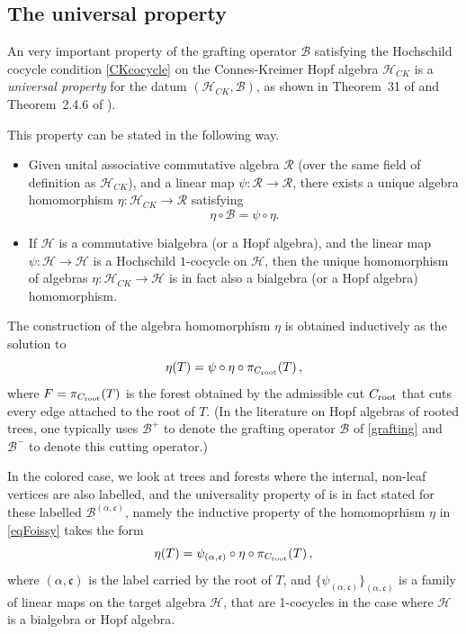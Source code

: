 \documentclass[12pt]{amsart}
\numberwithin{equation}{section}
\def\cB{{\mathcal B}}
\def\cH{{\mathcal H}}
\def\cR{{\mathcal R}}
\def\fc{{\mathfrak c}}
\begin{document}
\smallskip
\subsection{The universal property}\label{univpropBsec}

An very important property of the grafting operator $\cB$ satisfying the Hochschild
cocycle condition \eqref{CKcocycle} on the Connes-Kreimer Hopf algebra $\cH_{CK}$
is a {\em universal property} for the datum $(\cH_{CK}, \cB)$, as shown in Theorem~31 
of \cite{Foissy} and Theorem~2.4.6 of \cite{Panzer}). 

This property can be stated in the following way.
\begin{itemize}
\item Given unital associative commutative algebra $\cR$ (over the same field of definition as $\cH_{CK}$),
and a linear map $\psi: \cR \to \cR$, there exists a unique algebra homomorphism $\eta: \cH_{CK} \to \cR$
satisfying
\begin{equation}\label{univpropBeq}
\eta \circ \cB = \psi \circ \eta.
\end{equation}
\item If $\cH$ is a commutative bialgebra (or a Hopf algebra), and the linear map $\psi: \cH \to \cH$ is a Hochschild $1$-cocycle
on $\cH$, then the unique homomorphism of algebras $\eta: \cH_{CK} \to \cH$ is in fact also a bialgebra (or a Hopf algebra)
homomorphism.
\end{itemize}

The construction of the algebra homomorphism $\eta$ is obtained inductively as the solution to
\begin{equation}\label{eqFoissy}
\eta (T) = \psi \circ \eta \circ \pi_{C_{\rm root}}(T)\, ,
\end{equation}
where $F=\pi_{C_{\rm root}}(T)$ is the forest obtained by the admissible cut $C_{\rm root}$ that cuts every edge 
attached to the root of $T$. (In the literature on Hopf algebras of rooted trees, one typically uses $\cB^+$ 
to denote the grafting operator $\cB$ of \eqref{grafting} and $\cB^-$ to denote this cutting
operator.) 

\smallskip

In the colored case, we look at trees and forests where the internal, non-leaf vertices are also labelled, and the
universality property of \cite{Foissy} is in fact stated for these labelled $\cB^{(\alpha,\fc)}$, namely
the inductive property of the homomoprhism $\eta$ in \eqref{eqFoissy} takes the form
\begin{equation}\label{eqFoissyalpha}
\eta (T) = \psi_{(\alpha,\fc)} \circ \eta \circ \pi_{C_{\rm root}}(T)\, ,
\end{equation}
where $(\alpha,\fc)$ is the label carried by the root of $T$, and $\{ \psi_{(\alpha,\fc)} \}_{(\alpha,\fc)}$
is a family of linear maps on the target algebra $\cH$, that are 1-cocycles in the case where $\cH$ is a
bialgebra or Hopf algebra. 
\end{document}
